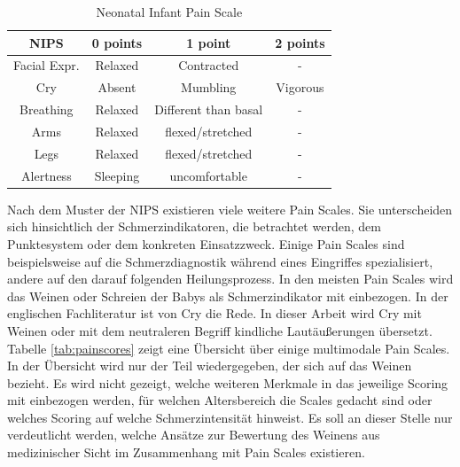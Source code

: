 \begin{table}[h]
	\footnotesize
	\centering
	\caption{Neonatal Infant Pain Scale \cite{nips}}
	\label{tab:nips}
	\begin{tabular}{@{}cccc@{}}
		\toprule
		\textbf{NIPS}     & \textbf{0 points} & \textbf{1 point}     & \textbf{2 points} \\ \midrule
		Facial Expr. & Relaxed           & Contracted           & -                 \\
		Cry               & Absent            & Mumbling             & Vigorous          \\
		Breathing         & Relaxed           & Different than basal & -                 \\
		Arms              & Relaxed           & flexed/stretched     & -                 \\
		Legs              & Relaxed           & flexed/stretched     & -                 \\
		Alertness         & Sleeping          & uncomfortable        & -                 \\ \bottomrule
	\end{tabular}
\end{table}


Nach dem Muster der NIPS existieren viele weitere Pain Scales. Sie unterscheiden sich hinsichtlich der Schmerzindikatoren, die betrachtet werden, dem Punktesystem oder dem konkreten Einsatzzweck. Einige Pain Scales sind beispielsweise auf die Schmerzdiagnostik während eines Eingriffes spezialisiert, andere auf den darauf folgenden Heilungsprozess. In den meisten Pain Scales wird das Weinen oder Schreien der Babys als Schmerzindikator mit einbezogen. In der englischen Fachliteratur ist von \glqq Cry\grqq{} die Rede.\cite[S. 97 - 98]{painInNeonates} In dieser Arbeit wird \glqq Cry\grqq{} mit \glqq Weinen\grqq{} oder mit dem neutraleren Begriff \glqq kindliche Lautäußerungen\grqq{} übersetzt. Tabelle \ref{tab:painscores} zeigt eine Übersicht über einige multimodale Pain Scales. In der Übersicht wird nur der Teil wiedergegeben, der sich auf das Weinen bezieht. Es wird nicht gezeigt, welche weiteren Merkmale in das jeweilige Scoring mit einbezogen werden, für welchen Altersbereich die Scales gedacht sind oder welches Scoring auf welche Schmerzintensität hinweist. Es soll an dieser Stelle nur verdeutlicht werden, welche Ansätze zur Bewertung des Weinens aus medizinischer Sicht im Zusammenhang mit Pain Scales existieren. 

